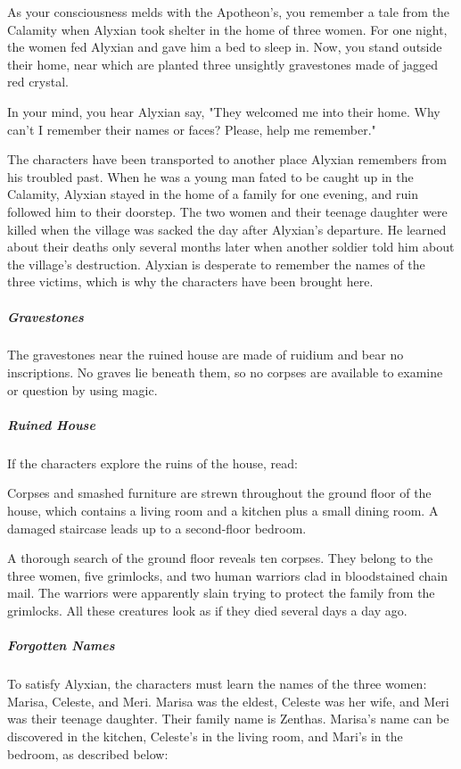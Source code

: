 \documentclass[10pt,a4paper,twoside,fancy,bg=print,twocolumn,openany,nodeprecatedcode]{dndbook}
\begin{document}
\begin{DndReadAloud}{}
As your consciousness melds with the Apotheon's, you remember a tale from the Calamity when Alyxian took shelter in the home of three women. For one night, the women fed Alyxian and gave him a bed to sleep in. Now, you stand outside their home, near which are planted three unsightly gravestones made of jagged red crystal.

In your mind, you hear Alyxian say, "They welcomed me into their home. Why can't I remember their names or faces? Please, help me remember."

\end{DndReadAloud}

The characters have been transported to another place Alyxian remembers from his troubled past. When he was a young man fated to be caught up in the Calamity, Alyxian stayed in the home of a family for one evening, and ruin followed him to their doorstep. The two women and their teenage daughter were killed when the village was sacked the day after Alyxian's departure. He learned about their deaths only several months later when another soldier told him about the village's destruction. Alyxian is desperate to remember the names of the three victims, which is why the characters have been brought here.

\subparagraph{Gravestones}
The gravestones near the ruined house are made of ruidium and bear no inscriptions. No graves lie beneath them, so no corpses are available to examine or question by using magic.

\subparagraph{Ruined House}
If the characters explore the ruins of the house, read:

\begin{DndReadAloud}{}
Corpses and smashed furniture are strewn throughout the ground floor of the house, which contains a living room and a kitchen plus a small dining room. A damaged staircase leads up to a second-floor bedroom.

\end{DndReadAloud}

A thorough search of the ground floor reveals ten corpses. They belong to the three women, five grimlocks, and two human warriors clad in bloodstained chain mail. The warriors were apparently slain trying to protect the family from the grimlocks. All these creatures look as if they died several days a day ago.

\subparagraph{Forgotten Names}
To satisfy Alyxian, the characters must learn the names of the three women: Marisa, Celeste, and Meri. Marisa was the eldest, Celeste was her wife, and Meri was their teenage daughter. Their family name is Zenthas. Marisa's name can be discovered in the kitchen, Celeste's in the living room, and Mari's in the bedroom, as described below:
\end{document}
